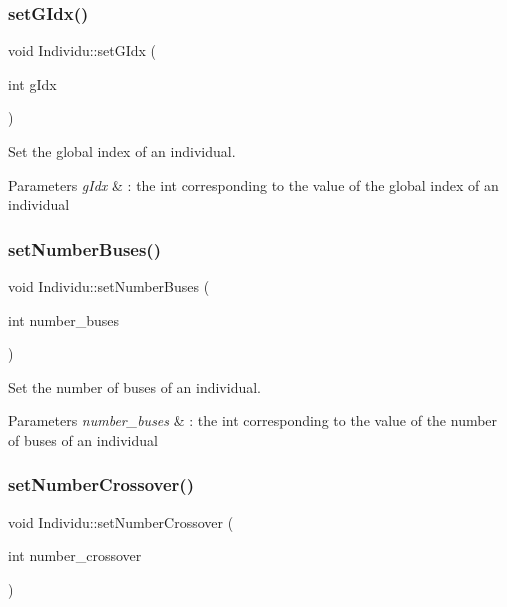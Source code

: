 \subsubsection{\texorpdfstring{set\+G\+Idx()}{setGIdx()}}
{\footnotesize\ttfamily void Individu\+::set\+G\+Idx (\begin{DoxyParamCaption}\item[{int}]{g\+Idx }\end{DoxyParamCaption})}



Set the global index of an individual. 


\begin{DoxyParams}{Parameters}
{\em g\+Idx} & \+: the int corresponding to the value of the global index of an individual \\
\hline
\end{DoxyParams}
\mbox{\label{class_individu_a85d185d2480ae6c279937bc4334190c6}} 
\subsubsection{\texorpdfstring{set\+Number\+Buses()}{setNumberBuses()}}
{\footnotesize\ttfamily void Individu\+::set\+Number\+Buses (\begin{DoxyParamCaption}\item[{int}]{number\+\_\+buses }\end{DoxyParamCaption})}



Set the number of buses of an individual. 


\begin{DoxyParams}{Parameters}
{\em number\+\_\+buses} & \+: the int corresponding to the value of the number of buses of an individual \\
\hline
\end{DoxyParams}
\mbox{\label{class_individu_acb83b642ec6c87abd2ca43c7479d79cf}} 
\subsubsection{\texorpdfstring{set\+Number\+Crossover()}{setNumberCrossover()}}
{\footnotesize\ttfamily void Individu\+::set\+Number\+Crossover (\begin{DoxyParamCaption}\item[{int}]{number\+\_\+crossover }\end{DoxyParamCaption})}



